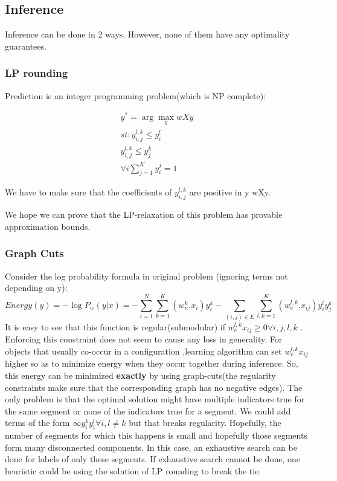 \documentclass[11pt,a4paper,oneside]{report}
\begin{document}
\subsection{Inference}
Inference can be done in 2 ways. However, none of them have any optimality guarantees.

\subsubsection{LP rounding}
Prediction is an integer programming problem(which is NP complete):


\begin{eqnarray*}
y^*=\arg \max _y wXy\\
st: y_{i,j}^{l,k}\le y_i^l\\
y_{i,j}^{l,k}\le y_j^k\\
\forall i \sum_{j=1}^{K} y_i^j = 1
\end{eqnarray*}
 
We have to make sure that the coefficients of $y_{i,j}^{l,k}$ are positive in  y wXy.

We hope we can prove that the LP-relaxation of this problem has provable approximation bounds.

\subsubsection{Graph Cuts}
Consider the log probability formula in original problem (ignoring terms not depending on y):
\begin{equation}
Energy(y)= -\log P_w (y|x) = -\sum_{i=1}^{N} \sum_{k=1}^{K} (w^{k}_{n}.x_{i})y_{i}^{k} - \sum_{(i,j)\in E} \sum_{l,k=1}^{K} (w_{e}^{l,k}.x_{ij})y_i^l y_j^k
\end{equation}
It is easy to see that this function is regular(submodular) if $w_e^{l,k}x_{ij} \ge 0 \forall i,j,l,k$ . Enforcing this constraint does not seem to cause any loss in generality. For objects that usually co-occur in a configuration ,learning algorithm can set $w_e^{l,k}x_{ij}$ higher so as to minimize energy when they occur together during inference. So, this energy can be minimized {\bf exactly} by using graph-cuts(the regularity constraints make sure that the corresponding graph has no negative edges). The only problem is that the optimal solution might have multiple indicators true for the same segment or none of the indicators true for a segment. We could add terms of the form $\infty y_i^ky_i^l \forall i, l\neq k$ but that breaks regularity.
Hopefully, the number of segments for which this happens is small and hopefully those segments form many disconnected components. In this case, an exhaustive search can be done for labels of only these segments.
If exhaustive search cannot be done, one heuristic could  be using the solution of LP rounding  to break the tie.
\end{document}
